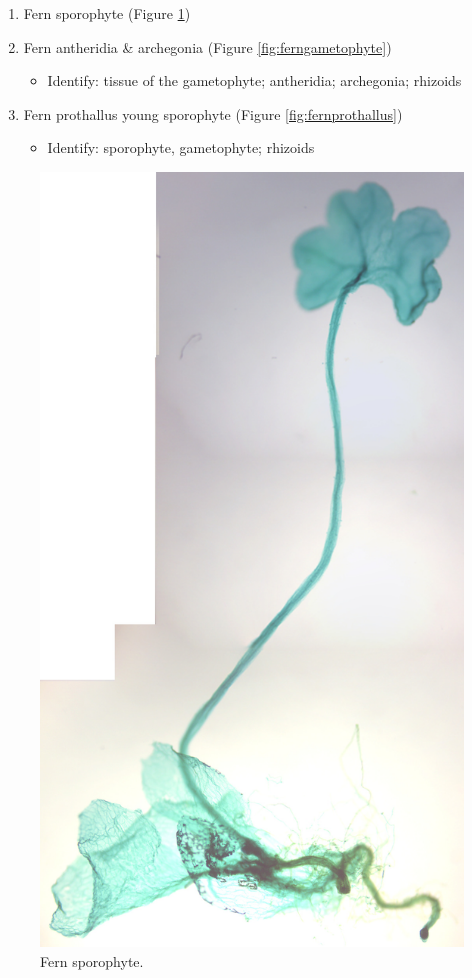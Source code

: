 \begin{enumerate}
\def\labelenumi{\arabic{enumi}.}
\tightlist
\item
  Fern sporophyte (Figure \ref{fig:fernsporophyte})
\item
  Fern antheridia \& archegonia (Figure \ref{fig:ferngametophyte})

  \begin{itemize}
  \tightlist
  \item
    Identify: tissue of the gametophyte; antheridia; archegonia;
    rhizoids
  \end{itemize}
\item
  Fern prothallus young sporophyte (Figure \ref{fig:fernprothallus})

  \begin{itemize}
  \tightlist
  \item
    Identify: sporophyte, gametophyte; rhizoids
  \end{itemize}
\end{enumerate}

\begin{figure}

{\centering \includegraphics[width=0.7\linewidth]{./figures/mosses/fern_sporophyte}

}

\caption{Fern sporophyte.}\label{fig:fernsporophyte}
\end{figure}

